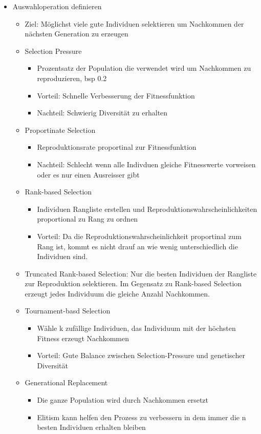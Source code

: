 \begin{itemize}
        \item Auswahloperation definieren
          \begin{itemize}
            \item Ziel: Möglichst viele gute Individuen selektieren um Nachkommen der nächsten Generation zu erzeugen
            \item Selection Pressure
              \begin{itemize}
                \item Prozentsatz der Population die verwendet wird um Nachkommen zu reproduzieren, bsp 0.2
                \item Vorteil: Schnelle Verbesserung der Fitnessfunktion
                \item Nachteil: Schwierig Diversität zu erhalten
              \end{itemize}
            \item Proportinate Selection
              \begin{itemize}
                \item Reproduktionsrate proportinal zur Fitnessfunktion
                \item Nachteil: Schlecht wenn alle Indivduen gleiche Fitnesswerte vorweisen oder es nur einen Ausreisser gibt
              \end{itemize}
            \item Rank-based Selection
              \begin{itemize}
                \item Individuen Rangliste erstellen und Reproduktionswahrscheinlichkeiten proportional zu Rang zu ordnen
                \item Vorteil: Da die Reproduktionswahrscheinlichkeit proportinal zum Rang ist, kommt es nicht drauf an wie wenig unterschiedlich die Individuen sind.
              \end{itemize}
            \item Truncated Rank-based Selection: Nur die besten Individuen der Rangliste zur Reproduktion selektieren. Im Gegensatz zu Rank-based Selection erzeugt jedes Individuum die gleiche Anzahl Nachkommen.
            \item Tournament-basd Selection
              \begin{itemize}
                \item Wähle k zufällige Individuen, das Individuum mit der höchsten Fitness erzeugt Nachkommen
                \item Vorteil: Gute Balance zwischen Selection-Pressure und genetischer Diversität
              \end{itemize}
            \item Generational Replacement
              \begin{itemize}
                \item Die ganze Population wird durch Nachkommen ersetzt
                \item Elitism kann helfen den Prozess zu verbessern in dem immer die n besten Individuen erhalten bleiben
              \end{itemize}



\end{itemize}
\end{itemize}
